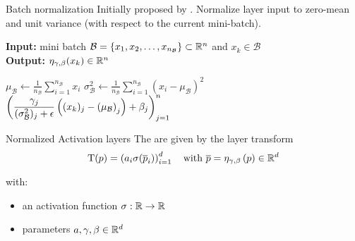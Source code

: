 \begin{frame}[c]{Batch normalization}
  Initially proposed by .
   Normalize layer input 
  to zero-mean and unit variance (with respect to the current mini-batch).

  \begin{algorithm}[H]
    \caption{Batch normalization transform $\eta_{\gamma, \beta}$}
    \textbf{Input:} mini batch $\mathcal{B} = \{x_1, x_2, \dots, x_{n_\mathcal{B}}\} \subset \mathbb{R}^n$ 
    and $x_k \in \mathcal{B}$ \\
    \textbf{Output:} $\eta_{\gamma, \beta}(x_k) \in \mathbb{R}^n$
    \begin{algorithmic}
       
        \State $\displaystyle
        \mu_\mathcal{B} \gets \frac{1}{n_\mathcal{B}} \sum_{i=1}^{n_\mathcal{B}} x_i$
        \State $\displaystyle
        \sigma^2_\mathcal{B} \gets \frac{1}{n_\mathcal{B}} \sum_{i=1}^{n_\mathcal{B}} 
        (x_i - \mu_\mathcal{B})^2$
      \EndIf
      \State \Return 
      $\displaystyle \left( \frac{\gamma_j}{(\sigma^2_\mathcal{B})_j + \epsilon} 
      \left( (x_k)_j - \left( \mu_\mathcal{B} \right)_j \right) + \beta_j \right)_{j=1}^n$
    \end{algorithmic}
  \end{algorithm}
\end{frame}

\begin{frame}[c]{Normalized Activation layers}
  The  are given by the layer transform
  \begin{equation*}
		\mathrm{T}(p) = \left( a_i \sigma(\overline{p}_i) \right)_{i=1}^d
		\quad \text{with } \overline{p} = \eta_{\gamma, \beta} \left( p \right) \in \mathbb{R}^d
	\end{equation*}

  with:
  \begin{itemize}
    \item an activation function $\sigma : \mathbb{R} \to \mathbb{R}$
    \item parameters $a,\gamma, \beta \in \mathbb{R}^d$ 
  \end{itemize}
\end{frame}

